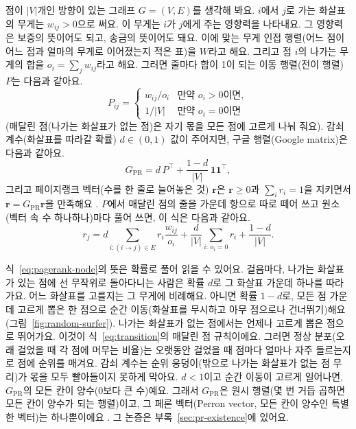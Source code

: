 점이 $|V|$개인 방향이 있는 그래프 $G=(V,E)$를 생각해 봐요. $i$에서 $j$로 가는 화살표의 무게는 $w_{ij}>0$으로 써요. 이 무게는 $i$가 $j$에게 주는 영향력을 나타내요. 그 영향력은 보증의 뜻이어도 되고, 송금의 뜻이어도 돼요. 이에 맞는 무게 인접 행렬(어느 점이 어느 점과 얼마의 무게로 이어졌는지 적은 표)을 $W$라고 해요. 그리고 점 $i$의 나가는 무게의 합을 $o_i=\sum_j w_{ij}$라고 해요. 그러면 줄마다 합이 1이 되는 이동 행렬(전이 행렬) $P$는 다음과 같아요.
\begin{equation}
P_{ij} =
\begin{cases}
w_{ij}/o_i & \text{만약 } o_i>0 \text{이면},\\
1/|V| & \text{만약 } o_i=0 \text{이면}
\end{cases}
\label{eq:transition}
\end{equation}
(매달린 점(나가는 화살표가 없는 점)은 자기 몫을 모든 점에 고르게 나눠 줘요). 감쇠 계수(화살표를 따라갈 확률) $d\in(0,1)$ 값이 주어지면, 구글 행렬(Google matrix)은 다음과 같아요.
\begin{equation}
G_{\mathrm{PR}} = d\, P^{\top} + \frac{1-d}{|V|}\,\mathbf{1}\mathbf{1}^{\top},
\label{eq:google-matrix}
\end{equation}
그리고 페이지랭크 벡터(수를 한 줄로 늘어놓은 것) $\mathbf{r}$은 $\mathbf{r}\geq 0$과 $\sum_i r_i=1$을 지키면서 $\mathbf{r}=G_{\mathrm{PR}}\mathbf{r}$을 만족해요 \parencite{langville2006pagerank}. $P$에서 매달린 점의 줄을 가운데 항으로 따로 떼어 쓰고 원소(벡터 속 수 하나하나)마다 풀어 쓰면, 이 식은 다음과 같아요.
\begin{equation}
r_j = d\sum_{i:(i\to j)\in E} r_i \frac{w_{ij}}{o_i} + \frac{d}{|V|}\sum_{i:\,o_i=0} r_i + \frac{1-d}{|V|}.
\label{eq:pagerank-node}
\end{equation}


식~\eqref{eq:pagerank-node}의 뜻은 확률로 풀어 읽을 수 있어요. 걸음마다, 나가는 화살표가 있는 점에 선 무작위로 돌아다니는 사람은 확률 $d$로 그 화살표 가운데 하나를 따라가요. 어느 화살표를 고를지는 그 무게에 비례해요. 아니면 확률 $1-d$로, 모든 점 가운데 고르게 뽑은 한 점으로 순간 이동(화살표를 무시하고 아무 점으로나 건너뛰기)해요(그림~\ref{fig:random-surfer}). 나가는 화살표가 없는 점에서는 언제나 고르게 뽑은 점으로 뛰어가요. 이것이 식~\eqref{eq:transition}의 매달린 점 규칙이에요. 그러면 정상 분포(오래 걸었을 때 각 점에 머무는 비율)는 오랫동안 걸었을 때 점마다 얼마나 자주 들르는지로 점에 순위를 매겨요. 감쇠 계수는 순위 웅덩이(밖으로 나가는 화살표가 없는 점 무리)가 몫을 모두 빨아들이지 못하게 막아요. $d<1$이고 순간 이동이 고르게 일어나면, $G_{\mathrm{PR}}$의 모든 칸이 양수(0보다 큰 수)예요. 그래서 $G_{\mathrm{PR}}$은 원시 행렬(몇 번 거듭 곱하면 모든 칸이 양수가 되는 행렬)이고, 그 페론 벡터(Perron vector, 모든 칸이 양수인 특별한 벡터)는 하나뿐이에요 \parencite{langville2006pagerank}. 그 논증은 부록~\ref{sec:pr-existence}에 있어요.

